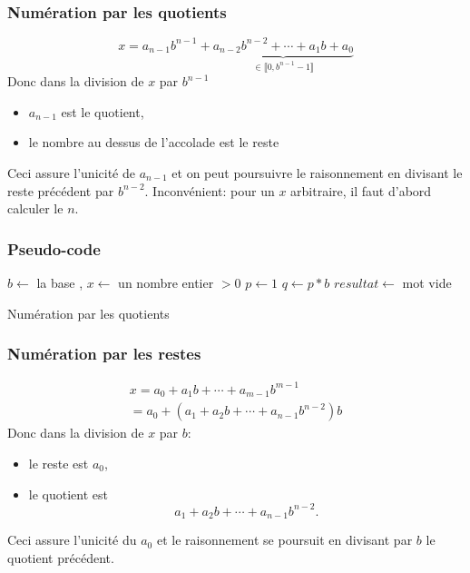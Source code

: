 \begin{frame}
 \frametitle{Numération par les quotients}
\begin{displaymath}
 x = a_{n-1}b^{n-1} + \underset{\in \llbracket 0 ,b^{n-1}-1\rrbracket}{\underbrace{a_{n-2}b^{n-2}  + \cdots + a_1 b + a_0}}
\end{displaymath}
Donc dans la division de $x$ par $b^{n-1}$
\begin{itemize}
 \item $a_{n-1}$ est le quotient,
 \item le nombre au dessus de l'accolade est le reste
\end{itemize}
Ceci assure l'unicité de $a_{n-1}$ et on peut poursuivre le raisonnement en divisant le reste précédent par $b^{n-2}$.\newline
Inconvénient: pour un $x$ arbitraire, il faut d'abord calculer le $n$.
\end{frame}

\begin{frame}
 \frametitle{Pseudo-code}
\begin{algorithm}[H]
 $b \leftarrow $ la base , $x \leftarrow $ un nombre entier $>0$ \;
 $p \leftarrow 1$\;
 $q \leftarrow p * b$\;
 $resultat \leftarrow$ mot vide \;
 \;
     \caption{Numération par les quotients}
\end{algorithm}
\end{frame}

\begin{frame}
 \frametitle{Numération par les restes}
\begin{multline*}
 x= a_0 + a_1 b +\cdots +a_{m-1}b^{m-1} \\
 = a_0 +(a_1+a_2b+\cdots+a_{n-1}b^{n-2})b
\end{multline*}
Donc dans la division de $x$ par $b$:
\begin{itemize}
 \item le reste est $a_0$,
 \item le quotient est 
\begin{displaymath}
a_1+a_2b+\cdots+a_{n-1}b^{n-2}. 
\end{displaymath}
\end{itemize}
Ceci assure l'unicité du $a_0$ et le raisonnement se poursuit en divisant par $b$ le quotient précédent.
\end{frame}

